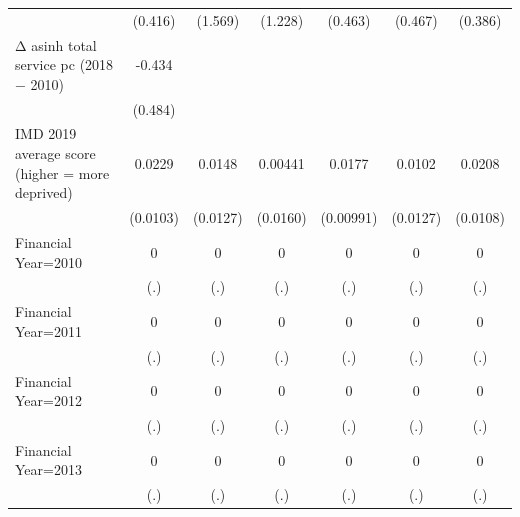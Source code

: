 \begin{table}[htbp]
\begin{tabular}{l*{6}{c}}
                    &     (0.416)         &     (1.569)         &     (1.228)         &     (0.463)         &     (0.467)         &     (0.386)         \\
\addlinespace
Δ asinh total service pc (2018 − 2010)&      -0.434         &                     &                     &                     &                     &                     \\
                    &     (0.484)         &                     &                     &                     &                     &                     \\
\addlinespace
IMD 2019 average score (higher = more deprived)&      0.0229\sym{**} &      0.0148         &     0.00441         &      0.0177\sym{*}  &      0.0102         &      0.0208\sym{*}  \\
                    &    (0.0103)         &    (0.0127)         &    (0.0160)         &   (0.00991)         &    (0.0127)         &    (0.0108)         \\
\addlinespace
Financial Year=2010 &           0         &           0         &           0         &           0         &           0         &           0         \\
                    &         (.)         &         (.)         &         (.)         &         (.)         &         (.)         &         (.)         \\
\addlinespace
Financial Year=2011 &           0         &           0         &           0         &           0         &           0         &           0         \\
                    &         (.)         &         (.)         &         (.)         &         (.)         &         (.)         &         (.)         \\
\addlinespace
Financial Year=2012 &           0         &           0         &           0         &           0         &           0         &           0         \\
                    &         (.)         &         (.)         &         (.)         &         (.)         &         (.)         &         (.)         \\
\addlinespace
Financial Year=2013 &           0         &           0         &           0         &           0         &           0         &           0         \\
                    &         (.)         &         (.)         &         (.)         &         (.)         &         (.)         &         (.)         \\

\end{tabular}
\end{table}
